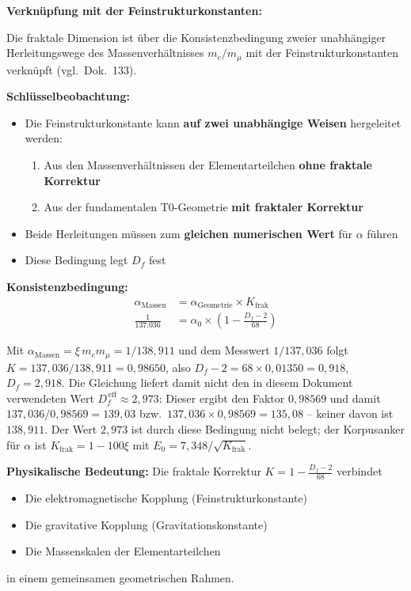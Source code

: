 	\begin{derivation}
		\textbf{Verknüpfung mit der Feinstrukturkonstanten:}
		
		Die fraktale Dimension ist über die Konsistenzbedingung zweier unabhängiger Herleitungswege des Massenverhältnisses $m_e/m_\mu$ mit der Feinstrukturkonstanten verknüpft (vgl.\ Dok.~133).
		
		\textbf{Schlüsselbeobachtung:}
		\begin{itemize}
			\item Die Feinstrukturkonstante kann \textbf{auf zwei unabhängige Weisen} hergeleitet werden:
			\begin{enumerate}
				\item Aus den Massenverhältnissen der Elementarteilchen \textbf{ohne fraktale Korrektur}
				\item Aus der fundamentalen T0-Geometrie \textbf{mit fraktaler Korrektur}
			\end{enumerate}
			\item Beide Herleitungen müssen zum \textbf{gleichen numerischen Wert} für $\alpha$ führen
			\item Diese Bedingung legt $D_f$ fest
		\end{itemize}
		
		\textbf{Konsistenzbedingung:}
		\begin{align}
			\alpha_{\text{Massen}} &= \alpha_{\text{Geometrie}} \times K_{\text{frak}} \\
			\frac{1}{137.036} &= \alpha_0 \times \left(1 - \frac{D_f - 2}{68}\right)
		\end{align}
		
		Mit $\alpha_{\text{Massen}} = \xi\,m_e m_\mu = 1/138{,}911$ und dem Messwert $1/137{,}036$ folgt $K = 137{,}036/138{,}911 = 0{,}98650$, also $D_f - 2 = 68 \times 0{,}01350 = 0{,}918$, $D_f = 2{,}918$. Die Gleichung liefert damit nicht den in diesem Dokument verwendeten Wert $D_f^{\,\text{eff}} \approx 2{,}973$: Dieser ergibt den Faktor $0{,}98569$ und damit $137{,}036/0{,}98569 = 139{,}03$ bzw.\ $137{,}036 \times 0{,}98569 = 135{,}08$ -- keiner davon ist $138{,}911$. Der Wert $2{,}973$ ist durch diese Bedingung nicht belegt; der Korpusanker für $\alpha$ ist $K_{\text{frak}} = 1 - 100\xi$ mit $E_0 = 7{,}348/\sqrt{K_{\text{frak}}}$.
		
		\textbf{Physikalische Bedeutung:}
		Die fraktale Korrektur $K = 1 - \frac{D_f - 2}{68}$ verbindet
		\begin{itemize}
			\item Die elektromagnetische Kopplung (Feinstrukturkonstante)
			\item Die gravitative Kopplung (Gravitationskonstante)
			\item Die Massenskalen der Elementarteilchen
		\end{itemize}
		in einem gemeinsamen geometrischen Rahmen.
	\end{derivation}
	
